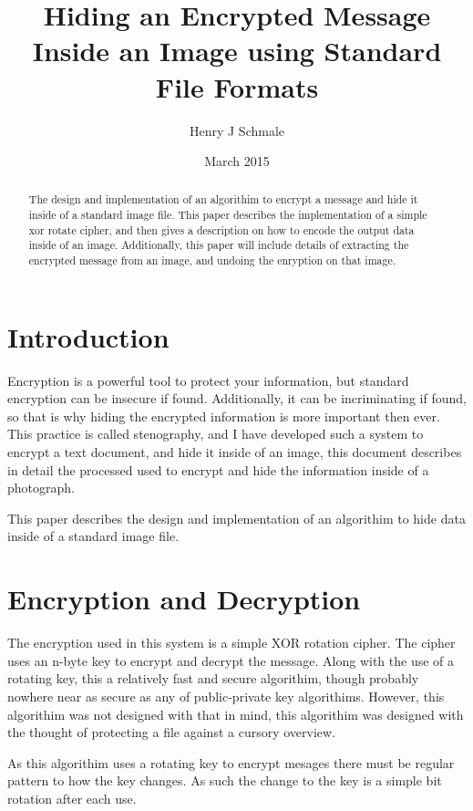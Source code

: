 \documentclass[12pt]{article}
\begin{document}
\title{Hiding an Encrypted Message Inside an Image using
      Standard File Formats}
\author{Henry J Schmale}
\date{March 2015}
\maketitle

\begin{abstract}
  The design and implementation of an algorithim to encrypt a message
  and hide it inside of a standard image file. This paper describes
  the implementation of a simple xor rotate cipher, and then gives
  a description on how to encode the output data inside of an image.
  Additionally, this paper will include details of extracting the
  encrypted message from an image, and undoing the enryption on that
  image.
\end{abstract}

\section{Introduction}
  Encryption is a powerful tool to protect your information, but standard
  encryption can be insecure if found. Additionally, it can be incriminating
  if found, so that is why hiding the encrypted information is more important
  then ever. This practice is called stenography, and I have developed such
  a system to encrypt a text document, and hide it inside of an image, this
  document describes in detail the processed used to encrypt and hide the
  information inside of a photograph.

  This paper describes the design and implementation of an algorithim to
  hide data inside of a standard image file. 

\section{Encryption and Decryption}
  The encryption used in this system is a simple XOR rotation cipher.
  The cipher uses an n-byte key to encrypt and decrypt the message.
  Along with the use of a rotating key, this a relatively fast and
  secure algorithim, though probably nowhere near as secure as any of
  public-private key algorithims. However, this algorithim was not
  designed with that in mind, this algorithim was designed with the
  thought of protecting a file against a cursory overview.
  
  As this algorithim uses a rotating key to encrypt mesages there
  must be regular pattern to how the key changes. As such the
  change to the key is a simple bit rotation after each use. 
  
\end{document}
